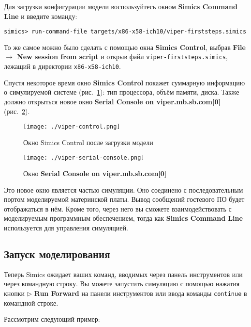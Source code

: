 Для загрузки конфигурации модели воспользуйтесь окном \textbf{Simics Command Line} и введите команду:

\begin{lstlisting}
simics> run-command-file targets/x86-x58-ich10/viper-firststeps.simics
\end{lstlisting}

То же самое можно было сделать с помощью окна \textbf{Simics Control}, выбрав \textbf{File $\to$ New session from script} и открыв файл \texttt{viper-firststeps.simics}, лежащий в директории \texttt{x86-x58-ich10}.

Спустя некоторое время окно \textbf{Simics Control} покажет суммарную информацию о симулируемой системе (рис.~\ref{fig:viper-control}): тип процессора, объём памяти, диска. Также должно открыться новое окно \textbf{Serial Console on viper.mb.sb.com[0]} (рис.~\ref{fig:viper-serial-console}).

\begin{figure}[ht]
    \centering
    \texttt{[image: ./viper-control.png]}
    \caption{Окно Simics Control после загрузки модели}
    \label{fig:viper-control}
\end{figure}

\begin{figure}[ht]
    \centering
    \texttt{[image: ./viper-serial-console.png]}
    \caption[Окно Serial Console]{Окно \textbf{Serial Console on viper.mb.sb.com[0]}}
    \label{fig:viper-serial-console}
\end{figure}

Это новое окно является частью симуляции. Оно соединено с последовательным портом моделируемой материнской платы. Вывод сообщений гостевого ПО будет отображаться в нём. Кроме того, через него вы сможете взаимодействовать с моделируемым программным обеспечением, тогда как \textbf{Simics Command Line} используется для управления симуляцией.

\subsection{Запуск моделирования}

Теперь Simics ожидает ваших команд, вводимых через панель инструментов или через командную строку. Вы можете запустить симуляцию с помощью нажатия кнопки $\triangleright$ \textbf{Run Forward} на панели инструментов или ввода команды \texttt{continue} в командной строке.

Рассмотрим следующий пример:

